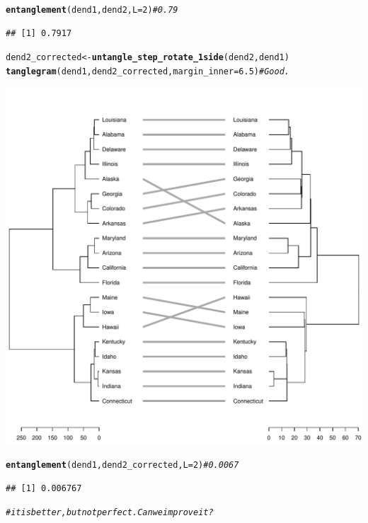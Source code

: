 \documentclass[shortnames,nojss,article]{jss}\usepackage[]{graphicx}\usepackage[]{color}
\makeatletter
\def\maxwidth{ %
  \ifdim\Gin@nat@width>\linewidth
    \linewidth
  \else
    \Gin@nat@width
  \fi
}
\newcommand{\hlnum}[1]{\textcolor[rgb]{0.686,0.059,0.569}{#1}}%
\newcommand{\hlcom}[1]{\textcolor[rgb]{0.678,0.584,0.686}{\textit{#1}}}%
\newcommand{\hlstd}[1]{\textcolor[rgb]{0.345,0.345,0.345}{#1}}%
\newcommand{\hlkwb}[1]{\textcolor[rgb]{0.69,0.353,0.396}{#1}}%
\newcommand{\hlkwc}[1]{\textcolor[rgb]{0.333,0.667,0.333}{#1}}%
\newcommand{\hlkwd}[1]{\textcolor[rgb]{0.737,0.353,0.396}{\textbf{#1}}}%
\newenvironment{kframe}{%
 \def\at@end@of@kframe{}%
 \ifinner\ifhmode%
  \def\at@end@of@kframe{\end{minipage}}%
  \begin{minipage}{\columnwidth}%
 \fi\fi%
 \def\FrameCommand##1{\hskip\@totalleftmargin \hskip-\fboxsep
 \colorbox{shadecolor}{##1}\hskip-\fboxsep
     \hskip-\linewidth \hskip-\@totalleftmargin \hskip\columnwidth}%
 \MakeFramed {\advance\hsize-\width
   \@totalleftmargin\z@ \linewidth\hsize
   \@setminipage}}%
 {\par\unskip\endMakeFramed%
 \at@end@of@kframe}
\newenvironment{knitrout}{}{} %
\makeatother
\begin{document}
\begin{knitrout}
{}


\begin{kframe}\begin{alltt}
\hlkwd{entanglement}\hlstd{(dend1, dend2,} \hlkwc{L} \hlstd{=} \hlnum{2}\hlstd{)}  \hlcom{# 0.79}
\end{alltt}
\begin{verbatim}
## [1] 0.7917
\end{verbatim}
\begin{alltt}
\hlstd{dend2_corrected} \hlkwb{<-} \hlkwd{untangle_step_rotate_1side}\hlstd{(dend2, dend1)}
\hlkwd{tanglegram}\hlstd{(dend1, dend2_corrected,} \hlkwc{margin_inner} \hlstd{=} \hlnum{6.5}\hlstd{)}  \hlcom{# Good.}
\end{alltt}
\end{kframe}

{\centering \includegraphics[width=\maxwidth]{figure/unnamed-chunk-402} 

}


\begin{kframe}\begin{alltt}
\hlkwd{entanglement}\hlstd{(dend1, dend2_corrected,} \hlkwc{L} \hlstd{=} \hlnum{2}\hlstd{)}  \hlcom{# 0.0067}
\end{alltt}
\begin{verbatim}
## [1] 0.006767
\end{verbatim}
\begin{alltt}
\hlcom{# it is better, but not perfect. Can we improve it?}


\end{alltt}
\end{kframe}
\end{knitrout}
\end{document}
